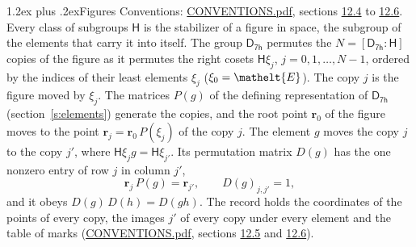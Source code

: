 \documentclass[10pt,a4paper]{article}
\makeatletter
\renewcommand\section{\@startsection{section}{1}{\z@}{-3ex plus -1ex minus -.2ex}%
  {1.2ex plus .2ex}{\normalfont\large\sffamily\bfseries\color{parttitle}}}
\numberwithin{equation}{section}
\newcommand{\eltfont}[1]{{\let\sigma\eltsigma\mathelt{#1}}}
\newcommand{\grp}[1]{\mathsf{#1}}
\newcommand{\cls}[1]{\eltfont{#1}}
\newcommand{\pointr}{\mathbf{r}}
\makeatother
\begin{document}
\section{Figures}\label{s:permutation}
Conventions: \href{../../CONVENTIONS.pdf}{CONVENTIONS.pdf}, sections \href{../../CONVENTIONS.pdf\#conv.12.4}{12.4} to \href{../../CONVENTIONS.pdf\#conv.12.6}{12.6}.
Every class of subgroups $\grp{H}$ is the stabilizer of a figure in space, the subgroup of the elements that carry it into itself. \label{n:local.orbit.size}\label{n:element.coset.least}\label{n:index.coset}The group $\grp{D_{7h}}$ permutes the $N = [\grp{D_{7h}} : \grp{H}]$ copies of the figure as it permutes the right cosets $\grp{H}\xi_j$, $j = 0, 1, \dots, N - 1$, ordered by the indices of their least elements $\xi_j$ ($\xi_0 = \cls{E}$). The copy $j$ is the figure moved by $\xi_j$. The matrices $P(g)$ of the defining representation of $\grp{D_{7h}}$ (section~\ref{s:elements}) generate the copies, and the root point $\pointr_0$ of the figure moves to the point $\pointr_j = \pointr_0\, P(\xi_j)$ of the copy $j$. \label{n:local.coset.image}The element $g$ moves the copy $j$ to the copy $j'$, where $\grp{H}\xi_j g = \grp{H}\xi_{j'}$. \label{n:local.matrix.permutation}Its permutation matrix $D(g)$ has the one nonzero entry of row $j$ in column $j'$,
\begin{equation}\label{e:perm.matrix}\pointr_j\, P(g) = \pointr_{j'}, \qquad D(g)_{j,j'} = 1,\end{equation}
and it obeys $D(g)\, D(h) = D(gh)$. The record holds the coordinates of the points of every copy, the images $j'$ of every copy under every element and the table of marks (\href{../../CONVENTIONS.pdf}{CONVENTIONS.pdf}, sections \href{../../CONVENTIONS.pdf\#conv.12.5}{12.5} and \href{../../CONVENTIONS.pdf\#conv.12.6}{12.6}).
\end{document}
